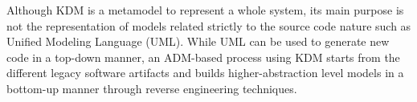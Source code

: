 Although KDM is a metamodel to represent a whole system, its main purpose is not the representation of models related strictly to the source code nature such as Unified Modeling Language (UML). While UML can be used to generate new code in a top-down manner, an ADM-based process using KDM starts from the different legacy software artifacts and builds higher-abstraction level models in a bottom-up manner through reverse engineering techniques. %

%
%



